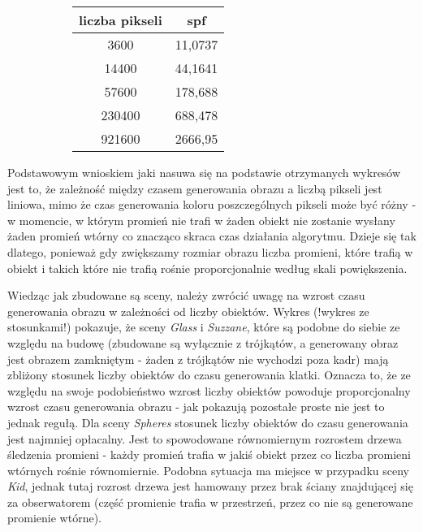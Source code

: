\begin{figure}[!htb]
\advance\leftskip-2cm
\begin{subfigure}{.5\textwidth}
\end{subfigure}
\hspace{2cm}
\begin{subfigure}{.5\textwidth}
		\begin{longtable}{|c|c|} \hline
	    liczba pikseli & spf \\ \hline
	    3600 & 11,0737 \\ 
	    14400 & 44,1641 \\
		57600 & 178,688 \\
		230400 & 688,478 \\
		921600 & 2666,95 \\
		\hline
		\end{longtable}
\end{subfigure}
\end{figure}

Podstawowym wnioskiem jaki nasuwa się na podstawie otrzymanych wykresów jest to, że zależność między czasem generowania obrazu a liczbą pikseli jest liniowa, mimo że czas generowania koloru poszczególnych pikseli może być różny - w momencie, w którym promień nie trafi w żaden obiekt nie zostanie wysłany żaden promień wtórny co znacząco skraca czas działania algorytmu. Dzieje się tak dlatego, ponieważ gdy zwiększamy rozmiar obrazu liczba promieni, które trafią w obiekt i takich które nie trafią rośnie proporcjonalnie według skali powiększenia.

Wiedząc jak zbudowane są sceny, należy zwrócić uwagę na wzrost czasu generowania obrazu w zależności od liczby obiektów. Wykres (!wykres ze stosunkami!) pokazuje, że sceny \emph{Glass} i \emph{Suzzane}, które są podobne do siebie ze względu na budowę (zbudowane są wyłącznie z trójkątów, a generowany obraz jest obrazem zamkniętym - żaden z trójkątów nie wychodzi poza kadr) mają zbliżony stosunek liczby obiektów do czasu generowania klatki. Oznacza to, że ze względu na swoje podobieństwo wzrost liczby obiektów powoduje proporcjonalny wzrost czasu generowania obrazu - jak pokazują pozostałe proste nie jest to jednak regułą. Dla sceny \emph{Spheres} stosunek liczby obiektów do czasu generowania jest najmniej opłacalny. Jest to spowodowane równomiernym rozrostem drzewa śledzenia promieni - każdy promień trafia w jakiś obiekt przez co liczba promieni wtórnych rośnie równomiernie. Podobna sytuacja ma miejsce w przypadku sceny \emph{Kid}, jednak tutaj rozrost drzewa jest hamowany przez brak ściany znajdującej się za obserwatorem (część promienie trafia w przestrzeń, przez co nie są generowane promienie wtórne).

